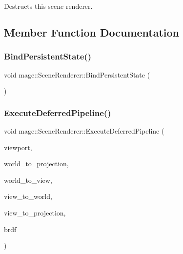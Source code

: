 Destructs this scene renderer. 

\subsection{Member Function Documentation}
\hypertarget{classmage_1_1_scene_renderer_a889e34c56566bdd270111b1ac2b0b810}{}\label{classmage_1_1_scene_renderer_a889e34c56566bdd270111b1ac2b0b810} 
\subsubsection{\texorpdfstring{Bind\+Persistent\+State()}{BindPersistentState()}}
{\footnotesize\ttfamily void mage\+::\+Scene\+Renderer\+::\+Bind\+Persistent\+State (\begin{DoxyParamCaption}{ }\end{DoxyParamCaption})\hspace{0.3cm}{\ttfamily [private]}}

\hypertarget{classmage_1_1_scene_renderer_a5a8b5e738debc0d429fd7f09f1061ec1}{}\label{classmage_1_1_scene_renderer_a5a8b5e738debc0d429fd7f09f1061ec1} 
\subsubsection{\texorpdfstring{Execute\+Deferred\+Pipeline()}{ExecuteDeferredPipeline()}}
{\footnotesize\ttfamily void mage\+::\+Scene\+Renderer\+::\+Execute\+Deferred\+Pipeline (\begin{DoxyParamCaption}\item[{const \hyperlink{structmage_1_1_viewport}{Viewport} \&}]{viewport,  }\item[{F\+X\+M\+M\+A\+T\+R\+IX}]{world\+\_\+to\+\_\+projection,  }\item[{C\+X\+M\+M\+A\+T\+R\+IX}]{world\+\_\+to\+\_\+view,  }\item[{C\+X\+M\+M\+A\+T\+R\+IX}]{view\+\_\+to\+\_\+world,  }\item[{C\+X\+M\+M\+A\+T\+R\+IX}]{view\+\_\+to\+\_\+projection,  }\item[{\hyperlink{namespacemage_ae7a7a03a7b34d7e2689689bb8295cd38}{B\+R\+D\+F\+Type}}]{brdf }\end{DoxyParamCaption})\hspace{0.3cm}{\ttfamily [private]}}

